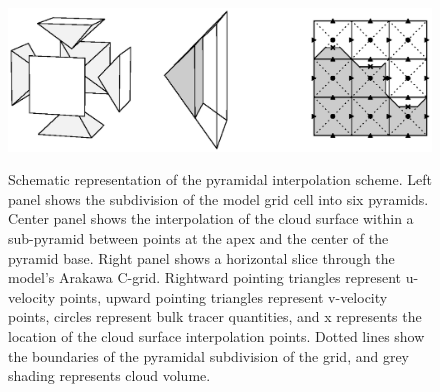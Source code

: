 \documentclass[12pt]{article}
\begin{document}


\begin{figure}[t]
  \noindent\includegraphics[width=40pc,angle=0]{./figures/pyramid_scheme.eps}\\
  \caption{Schematic representation of the pyramidal interpolation scheme.
Left panel shows the subdivision of the model grid cell into six pyramids.  
Center panel shows the interpolation of the cloud surface within a 
sub-pyramid between points at the  apex and the center of the pyramid base.  
Right panel shows a horizontal slice through the model's Arakawa C-grid.  
Rightward pointing triangles represent u-velocity points, upward pointing 
triangles represent v-velocity points, circles represent bulk tracer 
quantities, and x represents the location of the cloud surface interpolation
points.  Dotted lines show the boundaries of the pyramidal subdivision of the 
grid, and grey shading represents cloud volume.}\label{fig:pyramid_scheme}
\end{figure}
\end{document}
